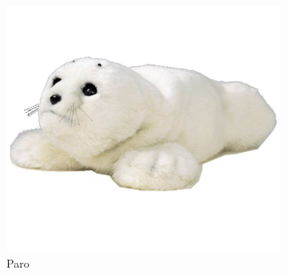 \begin{figure}[h]
\begin{subfigure}[h]{0.2\textwidth}
                \label{fig:pearl}
        \end{subfigure}
        \begin{subfigure}[h]{0.45\textwidth}
                \includegraphics[width=\textwidth]{./img/paro}
                \caption{Paro}
                \label{fig:paro}
        \end{subfigure}
        \begin{subfigure}[h]{0.2\textwidth}

\end{subfigure}
\end{figure}
